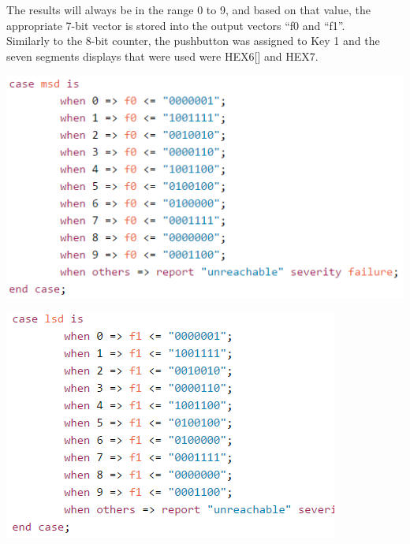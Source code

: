 \documentclass{article}
\newenvironment{Figure}
  {\par\medskip\noindent\ignorespaces\minipage{\linewidth}}
  {\endminipage\par\medskip}
\begin{document}
\begin{multicols*}{2}
The results will always be in the range 0 to 9, and based on that value, the appropriate 7-bit vector is stored into the output vectors “f0 and “f1”.\\
Similarly to the 8-bit counter, the pushbutton was assigned to Key 1 and the seven segments displays that were used were HEX6[] and HEX7.


\begin{Figure}
 \centering
 \includegraphics[width=\linewidth]{msd.png}
\end{Figure}

\begin{Figure}
 \centering
 \includegraphics[width=\linewidth]{lsd.png}
\end{Figure}




\end{multicols*}
\end{document}
